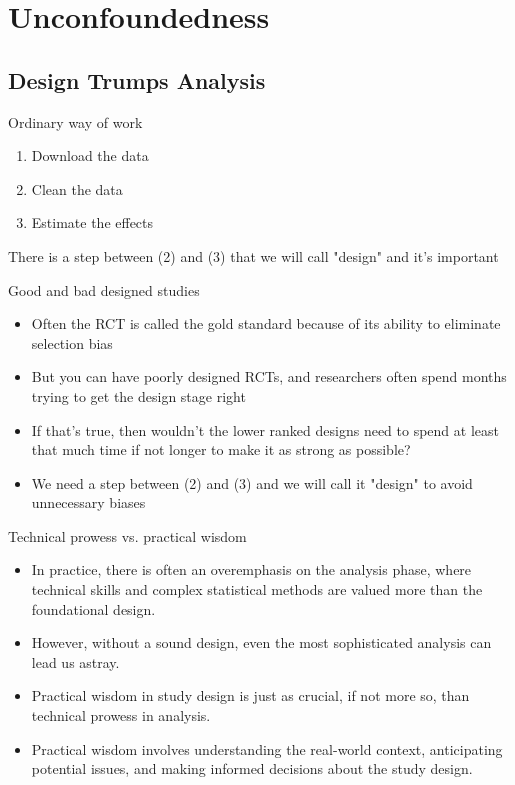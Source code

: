 \documentclass{beamer}
\begin{document}
\section{Unconfoundedness}



\subsection{Design Trumps Analysis}

\begin{frame}{Ordinary way of work}

\begin{enumerate}
\item Download the data
\item Clean the data
\item Estimate the effects
\end{enumerate}

There is a step between (2) and (3) that we will call "design" and it's important

\end{frame}

\begin{frame}{Good and bad designed studies}

\begin{itemize}
\item Often the RCT is called the gold standard because of its ability to eliminate selection bias
\item But you can have poorly designed RCTs, and researchers often spend months trying to get the design stage right
\item If that's true, then wouldn't the lower ranked designs need to spend at least that much time if not longer to make it as strong as possible?
\item We need a step between (2) and (3) and we will call it "design" to avoid unnecessary biases
  \end{itemize}
\end{frame}


\begin{frame}{Technical prowess vs. practical wisdom}
    	\begin{itemize}
	\item In practice, there is often an overemphasis on the analysis phase, where technical skills and complex statistical methods are valued more than the foundational design. 
	\item However, without a sound design, even the most sophisticated analysis can lead us astray.
	\item Practical wisdom in study design is just as crucial, if not more so, than technical prowess in analysis. 
	\item Practical wisdom involves understanding the real-world context, anticipating potential issues, and making informed decisions about the study design.
	\end{itemize}
\end{frame}
\end{document}
